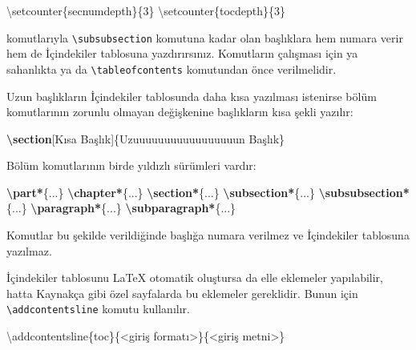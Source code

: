 \documentclass[
  10pt,
]{scrbook}
\newenvironment{Shaded}{\begin{snugshade}}{\end{snugshade}}
\newcommand{\FunctionTok}[1]{\textcolor[rgb]{0.00,0.00,0.00}{#1}}
\newcommand{\KeywordTok}[1]{\textcolor[rgb]{0.13,0.29,0.53}{\textbf{#1}}}
\newcommand{\NormalTok}[1]{#1}
\theoremstyle{definition}
\theoremstyle{definition}
\theoremstyle{definition}
\theoremstyle{definition}
\theoremstyle{remark}
\begin{document}
\begin{Shaded}
\begin{Highlighting}[]
\FunctionTok{\textbackslash{}setcounter}\NormalTok{\{secnumdepth\}\{3\}}
\FunctionTok{\textbackslash{}setcounter}\NormalTok{\{tocdepth\}\{3\}}
\end{Highlighting}
\end{Shaded}

komutlarıyla \texttt{\textbackslash{}subsubsection} komutuna kadar olan başlıklara hem numara verir hem de İçindekiler tablosuna yazdırırsınız. Komutların çalışması için ya sahanlıkta ya da \texttt{\textbackslash{}tableofcontents} komutundan önce verilmelidir.

Uzun başlıkların İçindekiler tablosunda daha kısa yazılması istenirse bölüm komutlarının zorunlu olmayan değişkenine başlıkların kısa şekli yazılır:

\begin{Shaded}
\begin{Highlighting}[]
\KeywordTok{\textbackslash{}section}\NormalTok{[Kısa Başlık]\{Uzuuuuuuuuuuuuuuuuun Başlık\}}
\end{Highlighting}
\end{Shaded}

Bölüm komutlarının birde yıldızlı sürümleri vardır:

\begin{Shaded}
\begin{Highlighting}[]
\KeywordTok{\textbackslash{}part*}\NormalTok{\{...\}}
\KeywordTok{\textbackslash{}chapter*}\NormalTok{\{...\}}
\KeywordTok{\textbackslash{}section*}\NormalTok{\{...\}}
\KeywordTok{\textbackslash{}subsection*}\NormalTok{\{...\}}
\KeywordTok{\textbackslash{}subsubsection*}\NormalTok{\{...\}}
\KeywordTok{\textbackslash{}paragraph*}\NormalTok{\{...\}}
\KeywordTok{\textbackslash{}subparagraph*}\NormalTok{\{...\}}
\end{Highlighting}
\end{Shaded}

Komutlar bu şekilde verildiğinde başlığa numara verilmez ve İçindekiler tablosuna yazılmaz.

İçindekiler tablosunu LaTeX otomatik oluştursa da elle eklemeler yapılabilir, hatta Kaynakça gibi özel sayfalarda bu eklemeler gereklidir. Bunun için \texttt{\textbackslash{}addcontentsline} komutu kullanılır.

\begin{Shaded}
\begin{Highlighting}[]
\FunctionTok{\textbackslash{}addcontentsline}\NormalTok{\{toc\}\{\textless{}giriş formatı\textgreater{}\}\{\textless{}giriş metni\textgreater{}\}}
\end{Highlighting}
\end{Shaded}
\end{document}
